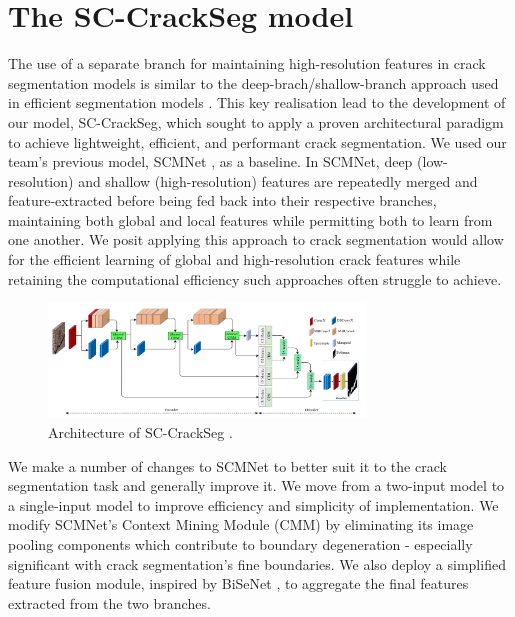 \documentclass[a4paper,12pt]{report}
\begin{document}
\section{The SC-CrackSeg model}

The use of a separate branch for maintaining high-resolution features in crack segmentation models \cite{nayyeri_multi-resolution_2021} is similar to the deep-brach/shallow-branch approach used in efficient segmentation models \cite{yu_bisenet_2018} \cite{poudel_contextnet_2018}. This key realisation lead to the development of our model, SC-CrackSeg, which sought to apply a proven architectural paradigm to achieve lightweight, efficient, and performant crack segmentation. We used our team's previous model, SCMNet \cite{singha_scmnet_2021}, as a baseline. In SCMNet, deep (low-resolution) and shallow (high-resolution) features are repeatedly merged and feature-extracted before being fed back into their respective branches, maintaining both global and local features while permitting both to learn from one another. We posit applying this approach to crack segmentation would allow for the efficient learning of global and high-resolution crack features while retaining the computational efficiency such approaches often struggle to achieve.

\begin{figure}[h]
    \centering
    \includegraphics[width=0.75\textwidth]{res/sc-crackseg-architecture.png}
    \caption{Architecture of SC-CrackSeg \cite{singha_sc-crackseg_2022}.}
    \label{fig:sc-crackseg-architecture}
\end{figure}

We make a number of changes to SCMNet to better suit it to the crack segmentation task and generally improve it. We move from a two-input model to a single-input model to improve efficiency and simplicity of implementation. We modify SCMNet's Context Mining Module (CMM) by eliminating its image pooling components which contribute to boundary degeneration - especially significant with crack segmentation's fine boundaries. We also deploy a simplified feature fusion module, inspired by BiSeNet \cite{yu_bisenet_2018}, to aggregate the final features extracted from the two branches.
\end{document}
